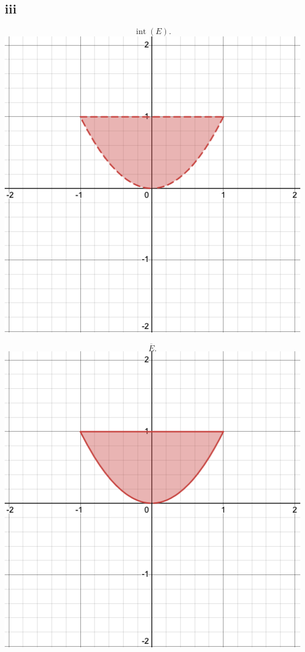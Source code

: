 \documentclass{eeleyes}
\newcommand\conj[1]{\overline{#1}}
\DeclareMathOperator{\interior}{int}
\begin{document}
\subsection*{iii}
\begin{multicols}{3}
\begin{center}
    \[
        \interior(E)
    .\]
    \includegraphics[width=0.8\linewidth]{figures/iii_img-1.png}
\end{center}

\columnbreak

\begin{center}
    \[
        \conj{E}
    .\]
    \includegraphics[width=0.8\linewidth]{figures/iii_img-2.png}
\end{center}


\end{multicols}
\end{document}
